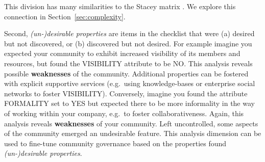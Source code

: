 \begin{enumerate}
%
\end{enumerate}

This division has many similarities to the Stacey matrix \cite{sta02aa}. We explore this connection in Section~\ref{sec:complexity}.

Second, \emph{\mbox{(un-)desirable} properties} are items in the checklist that were (a) desired but not discovered, or (b) discovered but not desired. For example imagine you expected your community to exhibit increased visibility of its members and resources, but found the VISIBILITY attribute to be NO. This analysis reveals possible \textbf{weaknesses} of the community. Additional properties can be fostered with explicit supportive services (e.g.~using knowledge-bases or enterprise social networks to foster VISIBILITY). Conversely, imagine you found the attribute FORMALITY set to YES but expected there to be more informality in the way of working within your company, e.g.~to foster collaborativeness. Again, this analysis reveals \textbf{weaknesses} of your community. Left uncontrolled, some aspects of the community emerged an undesirable feature. This analysis dimension can be used to fine-tune community governance based on the properties found \emph{\mbox{(un-)desirable} properties}.


